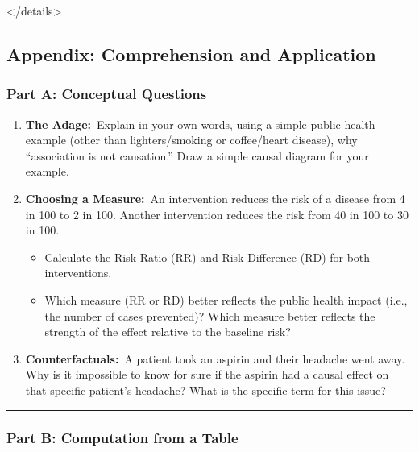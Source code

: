 \documentclass[
  10pt,
  letterpaper,
  DIV=11,
  numbers=noendperiod]{scrartcl}
\begin{document}
\textless/details\textgreater{}

\subsection{Appendix: Comprehension and
Application}\label{appendix-comprehension-and-application-1}

\subsubsection{Part A: Conceptual Questions
🧠}\label{part-a-conceptual-questions-2}

\begin{enumerate}
\def\labelenumi{\arabic{enumi}.}
\item
  \textbf{The Adage:}~Explain in your own words, using a simple public
  health example (other than lighters/smoking or coffee/heart disease),
  why ``association is not causation.'' Draw a simple causal diagram for
  your example.
\item
  \textbf{Choosing a Measure:}~An intervention reduces the risk of a
  disease from 4 in 100 to 2 in 100. Another intervention reduces the
  risk from 40 in 100 to 30 in 100.

  \begin{itemize}
  \item
    Calculate the Risk Ratio (RR) and Risk Difference (RD) for both
    interventions.
  \item
    Which measure (RR or RD) better reflects the public health impact
    (i.e., the number of cases prevented)? Which measure better reflects
    the strength of the effect relative to the baseline risk?
  \end{itemize}
\item
  \textbf{Counterfactuals:}~A patient took an aspirin and their headache
  went away. Why is it impossible to know for sure if the aspirin had a
  causal effect on that specific patient's headache? What is the
  specific term for this issue?
\end{enumerate}

\begin{center}\rule{0.5\linewidth}{0.5pt}\end{center}

\subsubsection{Part B: Computation from a Table
🔢}\label{part-b-computation-from-a-table-2}
\end{document}
